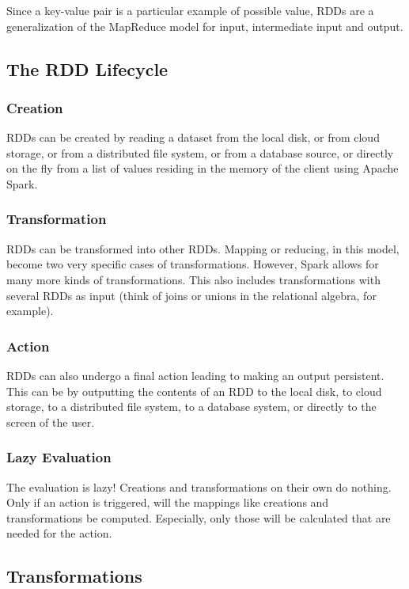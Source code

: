 Since a key-value pair is a particular example of possible value, RDDs are a generalization of the MapReduce model for input, intermediate input and output.


\subsection{The RDD Lifecycle}

\subsubsection{Creation}
RDDs can be created by reading a dataset from the local disk, or from cloud storage, or from a distributed file system, or from a database source, or directly on the fly from a list of values residing in the memory of the client using Apache Spark.

\subsubsection{Transformation}
RDDs can be transformed into other RDDs. Mapping or reducing, in this model, become two very specific cases of transformations. However, Spark allows for many more kinds of transformations. This also includes transformations with several RDDs as input (think of joins or unions in the relational algebra, for example).

\subsubsection{Action}
RDDs can also undergo a final action leading to making an output persistent. This can be by outputting the contents of an RDD to the local disk, to cloud storage, to a distributed file system, to a database system, or directly to the screen of the user.

\subsubsection{Lazy Evaluation}
The evaluation is lazy! Creations and transformations on their own do nothing. Only if an action is triggered, will the mappings like creations and transformations be computed. Especially, only those will be calculated that are needed for the action.


\subsection{Transformations}

